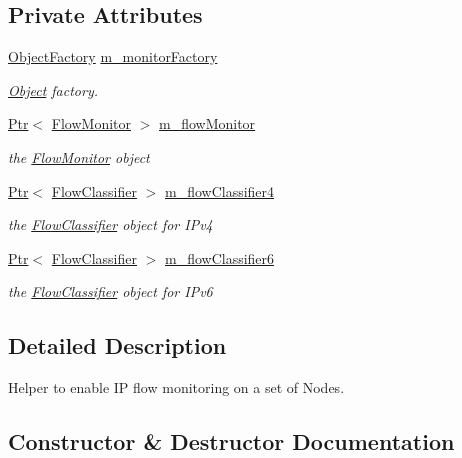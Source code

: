 \subsection*{Private Attributes}
\begin{DoxyCompactItemize}
\item 
\hyperlink{classns3_1_1ObjectFactory}{Object\+Factory} \hyperlink{classns3_1_1FlowMonitorHelper_acfb30f8ccb4ec81de183b7dbaa4265fe}{m\+\_\+monitor\+Factory}
\begin{DoxyCompactList}\small\item\em \hyperlink{classns3_1_1Object}{Object} factory. \end{DoxyCompactList}\item 
\hyperlink{classns3_1_1Ptr}{Ptr}$<$ \hyperlink{classns3_1_1FlowMonitor}{Flow\+Monitor} $>$ \hyperlink{classns3_1_1FlowMonitorHelper_adabd8f957790154f8b40da80833c1954}{m\+\_\+flow\+Monitor}
\begin{DoxyCompactList}\small\item\em the \hyperlink{classns3_1_1FlowMonitor}{Flow\+Monitor} object \end{DoxyCompactList}\item 
\hyperlink{classns3_1_1Ptr}{Ptr}$<$ \hyperlink{classns3_1_1FlowClassifier}{Flow\+Classifier} $>$ \hyperlink{classns3_1_1FlowMonitorHelper_aaf6fe89955c90d8f66ac61b90c13b97f}{m\+\_\+flow\+Classifier4}
\begin{DoxyCompactList}\small\item\em the \hyperlink{classns3_1_1FlowClassifier}{Flow\+Classifier} object for I\+Pv4 \end{DoxyCompactList}\item 
\hyperlink{classns3_1_1Ptr}{Ptr}$<$ \hyperlink{classns3_1_1FlowClassifier}{Flow\+Classifier} $>$ \hyperlink{classns3_1_1FlowMonitorHelper_a03b1e507ed0dc764b55e80c5ae2147b7}{m\+\_\+flow\+Classifier6}
\begin{DoxyCompactList}\small\item\em the \hyperlink{classns3_1_1FlowClassifier}{Flow\+Classifier} object for I\+Pv6 \end{DoxyCompactList}\end{DoxyCompactItemize}


\subsection{Detailed Description}
Helper to enable IP flow monitoring on a set of Nodes. 

\subsection{Constructor \& Destructor Documentation}
